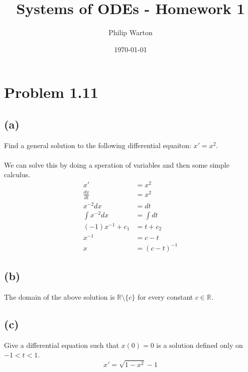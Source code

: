 \documentclass{article}
\theoremstyle{definition}
\begin{document}
\title{Systems of ODEs - Homework 1}
\author{Philip Warton}
\date{\today}
\maketitle
\section*{Problem 1.11}
\subsection*{(a)}
Find a general solution to the following differential equaiton: $x' = x^2$.
\\\\
We can solve this by doing a speration of variables and then some simple calculus.
\begin{align*}
    x' & = x^2 \\
    \frac{dx}{dt} & = x^2 \\
    x^{-2} dx & = dt \\
    \int x^{-2} dx & = \int dt \\
    (-1)x^{-1} + c_1 & = t + c_2 \\
    x^{-1} & = c - t \\
    x & = (c - t)^{-1}
\end{align*}
\subsection*{(b)}
The domain of the above solution is $\mathbb{R} \setminus \{c\}$ for every constant $c \in \mathbb{R}$.
\subsection*{(c)}
Give a differential equation such that $x(0) = 0$ is a solution defined only on $-1 < t < 1$.
\[
    x' = \sqrt{1 - x^2} - 1
\]
\end{document}
